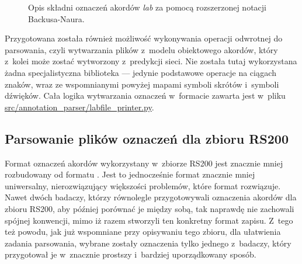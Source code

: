 \begin{figure}[tb]
    \centering
    {\scriptsize }
    \caption{Opis składni oznaczeń akordów \emph{lab} za pomocą rozszerzonej notacji Backusa-Naura.}
    \label{fig:lab_syntax}
\end{figure}

Przygotowana została również możliwość wykonywania operacji odwrotnej do parsowania, czyli wytwarzania plików  z~modelu obiektowego akordów, który z~kolei może zostać wytworzony z~predykcji sieci. Nie została tutaj wykorzystana żadna specjalistyczna biblioteka --- jedynie podstawowe operacje na ciągach znaków, wraz ze wspomnianymi powyżej mapami symboli skrótów i~symboli dźwięków. Cała logika wytwarzania oznaczeń w~formacie  zawarta jest w~pliku \url{src/annotation_parser/labfile_printer.py}.

\subsection{Parsowanie plików oznaczeń dla zbioru RS200}

Format oznaczeń akordów wykorzystany w~zbiorze RS200 jest znacznie mniej rozbudowany od formatu . Jest to jednocześnie format znacznie mniej uniwersalny, nierozwiązujący większości problemów, które format  rozwiązuje. Nawet dwóch badaczy, którzy równolegle przygotowywali oznaczenia akordów dla zbioru RS200, aby później porównać je między sobą, tak naprawdę nie zachowali spójnej konwencji, mimo iż razem stworzyli ten konkretny format zapisu. Z~tego też powodu, jak już wspomniane przy opisywaniu tego zbioru, dla ułatwienia zadania parsowania, wybrane zostały oznaczenia tylko jednego z~badaczy, który przygotował je w~znacznie prostszy i~bardziej uporządkowany sposób.

